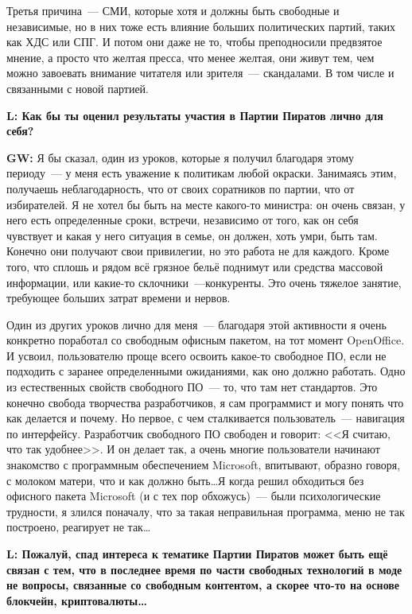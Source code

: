 \documentclass[10pt, a5paper]{article}
\begin{document}
\begin{Parallel}[p]{}{}
{Третья причина~--- СМИ, которые хотя и должны быть свободные и независимые, но в них тоже есть влияние больших политических партий, таких как ХДС или СПГ. И потом они даже не то, чтобы преподносили предвзятое мнение, а просто что желтая пресса, что менее желтая, они живут тем, чем можно завоевать внимание читателя или зрителя~--- скандалами. В том числе и связанными с новой партией. 


{\noindent \bf L: Как бы ты оценил результаты участия в Партии Пиратов лично для себя?}

{\noindent \bf GW:} Я бы сказал, один из уроков, которые я получил благодаря этому периоду~--- у меня есть уважение к политикам любой окраски. Занимаясь этим, получаешь неблагодарность, что от своих соратников по партии, что от избирателей.  Я не хотел бы быть на месте какого-то министра: он очень связан, у него есть определенные сроки, встречи, независимо от того, как он себя чувствует и какая у него ситуация в семье, он должен, хоть умри, быть там. Конечно они получают свои привилегии, но это работа не для каждого. Кроме того, что сплошь и рядом всё грязное бельё поднимут или средства массовой информации, или какие-то склочники~---конкуренты. Это очень тяжелое занятие, требующее больших затрат времени и нервов.

Один из других уроков лично для меня~--- благодаря этой активности я очень конкретно поработал со свободным офисным пакетом, на тот момент OpenOffice. И усвоил, пользователю проще всего освоить какое-то свободное ПО, если не подходить с заранее определенными ожиданиями, как оно должно работать. Одно из естественных свойств свободного ПО~--- то, что там нет стандартов. Это конечно свобода творчества разработчиков, я сам программист и могу понять что как делается и почему. 
Но первое, с чем сталкивается пользователь~--- навигация по интерфейсу. Разработчик свободного ПО свободен и говорит: <<Я считаю, что так удобнее>>. И он делает так, а очень многие пользователи начинают знакомство с программным обеспечением Microsoft, впитывают, образно говоря, с молоком матери, что и как должно быть\ldots Я когда решил обходиться без офисного пакета Microsoft (и с тех пор обхожусь)~--- были психологические трудности, я злился поначалу, что за такая неправильная программа, меню не так построено, реагирует не так\ldots

{\noindent \bf L:  Пожалуй, спад интереса к тематике Партии Пиратов может быть ещё связан с тем, что в последнее время по части свободных технологий в моде не вопросы, связанные со свободным контентом, а скорее что-то на основе блокчейн, криптовалюты\ldots}

}
\end{Parallel}
\end{document}
